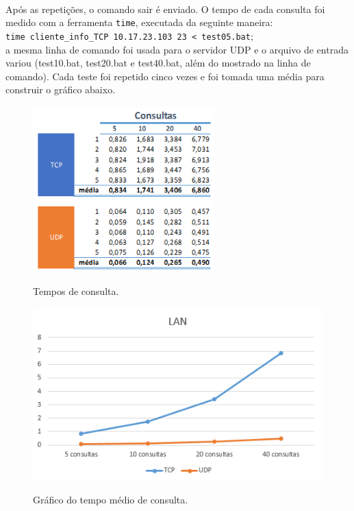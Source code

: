 \documentclass[a4paper,10pt,oneside,final,titlepage,onecolumn]{scrartcl}
\begin{document}
\paragraph{}Após as repetições, o comando sair é enviado. O tempo de cada consulta foi medido com a ferramenta \verb|time|, executada da seguinte maneira:
\\ \verb|time cliente_info_TCP 10.17.23.103 23 < test05.bat|;
\\ a mesma linha de comando foi usada para o servidor UDP e o arquivo de entrada variou (test10.bat, test20.bat e test40.bat, além do mostrado na linha de comando). Cada teste foi repetido cinco vezes e foi tomada uma média para construir o gráfico abaixo.
\begin{figure}[!ht]
  \caption{Tempos de consulta.}
  \centering
  \includegraphics[width=70mm]{table-lan.png}
  \label{netstat}
\end{figure}
\begin{figure}[!ht]
  \caption{Gráfico do tempo médio de consulta.}
  \centering
  \includegraphics[width=117mm]{graph_lan.png}
  \label{netstat}
\end{figure}



\FloatBarrier
\end{document}
